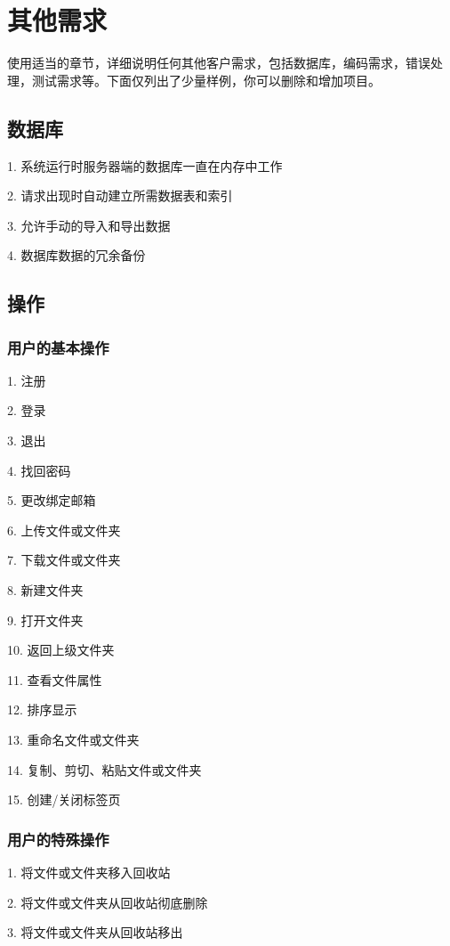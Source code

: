 \chapter{其他需求}

使用适当的章节，详细说明任何其他客户需求，包括数据库，编码需求，错误处理，测试需求等。下面仅列出了少量样例，你可以删除和增加项目。

\section{数据库}
    
    1. 系统运行时服务器端的数据库一直在内存中工作

    2. 请求出现时自动建立所需数据表和索引

    3. 允许手动的导入和导出数据

    4. 数据库数据的冗余备份
\section{操作}
\subsection{用户的基本操作}

    1. 注册

    2. 登录

    3. 退出

    4. 找回密码

    5. 更改绑定邮箱

    6. 上传文件或文件夹

    7. 下载文件或文件夹

    8. 新建文件夹

    9. 打开文件夹

    10. 返回上级文件夹

    11. 查看文件属性

    12. 排序显示

    13. 重命名文件或文件夹

    14. 复制、剪切、粘贴文件或文件夹

    15. 创建/关闭标签页
\subsection{用户的特殊操作}

    1. 将文件或文件夹移入回收站

    2. 将文件或文件夹从回收站彻底删除

    3. 将文件或文件夹从回收站移出

